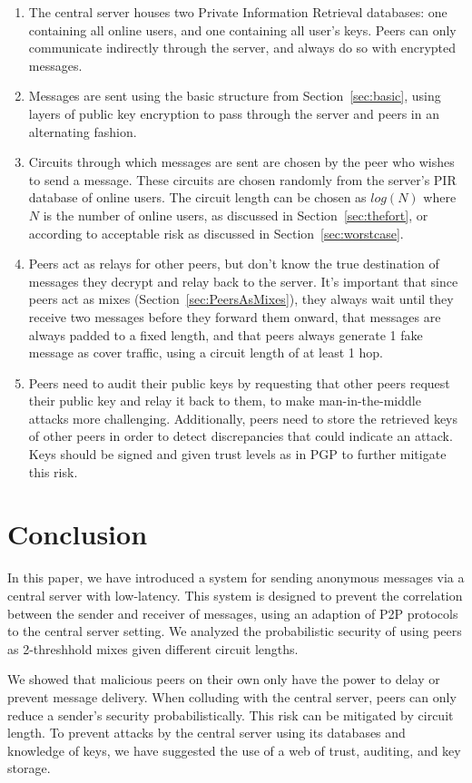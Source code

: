 \documentclass[twocolumn,11pt,english]{article}
\begin{document}
\begin{enumerate}
  
  \item The central server houses two Private Information Retrieval databases: one containing all online users, and one containing all user's keys. Peers can only communicate indirectly through the server, and always do so with encrypted messages. 
  \item Messages are sent using the basic structure from Section~\ref{sec:basic}, using layers of public key encryption to pass through the server and peers in an alternating fashion. 
  \item Circuits through which messages are sent are chosen by the peer who wishes to send a message. These circuits are chosen randomly from the server's PIR database of online users. The circuit length can be chosen as $log(N)$ where $N$ is the number of online users, as discussed in Section~\ref{sec:thefort}, or according to acceptable risk as discussed in Section~\ref{sec:worstcase}.
  \item Peers act as relays for other peers, but don't know the true destination of messages they decrypt and relay back to the server. It's important that since peers act as mixes (Section~\ref{sec:PeersAsMixes}), they always wait until they receive two messages before they forward them onward, that messages are always padded to a fixed length, and that peers always generate 1 fake message as cover traffic, using a circuit length of at least 1 hop.
  \item Peers need to audit their public keys by requesting that other peers request their public key and relay it back to them, to make man-in-the-middle attacks more challenging. Additionally, peers need to store the retrieved keys of other peers in order to detect discrepancies that could indicate an attack. Keys should be signed and given trust levels as in PGP to further mitigate this risk. 
\end{enumerate}

\section{Conclusion}
In this paper, we have introduced a system for sending anonymous messages via a central server with low-latency. This system is designed to prevent the correlation between the sender and receiver of messages, using an adaption of P2P protocols to the central server setting. We analyzed the probabilistic security of using peers as 2-threshhold mixes given different circuit lengths.

We showed that malicious peers on their own only have the power to delay or prevent message delivery. When colluding with the central server, peers can only reduce a sender's security probabilistically. This risk can be mitigated by circuit length. To prevent attacks by the central server using its databases and knowledge of keys, we have suggested the use of a web of trust, auditing, and key storage. 
\newpage
\begin{figure}


\end{figure}
\end{document}
